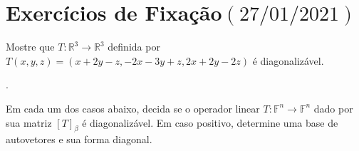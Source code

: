 \chapter{Exercícios de Fixação\quad$\left(27/01/2021\right)$}

\begin{questions}
	\question\label{exercício:3.1}

	Mostre que $T\colon\mathbb{R}^{3}\to\mathbb{R}^{3}$ definida por
	$T\left(x,y,z\right)=\left(x+2y-z,-2x-3y+z,2 x+2y-2z\right)$ é
	diagonalizável.

	\begin{solutionordottedlines}
		.
	\end{solutionordottedlines}

	\question\label{exercício:3.2}

	Em cada um dos casos abaixo, decida se o operador linear
	$T\colon\mathbb{F}^{n}\to\mathbb{F}^{n}$ dado por sua matriz
	${\left[T\right]}_{\beta}$ é diagonalizável.
	Em caso positivo, determine uma base de autovetores e sua forma
	diagonal.

	\begin{parts}
\end{parts}
\end{questions}
